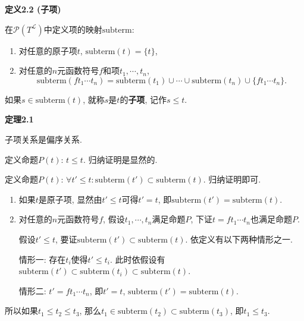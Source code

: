 \documentclass[UTF8]{ctexart}
\begin{document}
\hypertarget{sec:定义2.2}{}
\noindent\textbf{定义2.2 (子项)}

在$\mathcal{P}(T^{\mathcal{L}})$中定义项的映射$\mathrm{subterm}$:
\begin{enumerate}
    \item 对任意的原子项$t$, $\mathrm{subterm}(t)=\{t\}$,
    \item 对任意的$n$元函数符号$f$和项$t_1,\cdots,t_n$,
    \[
        \mathrm{subterm}(ft_1\cdots t_n)=\mathrm{subterm}(t_1)\cup\cdots\cup
        \mathrm{subterm}(t_n)\cup\{ft_1\cdots t_n\}.
    \]
\end{enumerate}

如果$s\in\mathrm{subterm}(t)$, 就称$s$是$t$的\textbf{子项}, 记作$s\leqslant t$.

\vspace{10pt}

\hypertarget{sec:定理2.1}{}
\noindent\textbf{定理2.1}

子项关系是偏序关系.



定义命题$P(t)$: $t\leqslant t$. 归纳证明是显然的.


定义命题$P(t)$: $\forall t'\leqslant t:
\mathrm{subterm}(t')\subset\mathrm{subterm}(t)$. 归纳证明即可.

\begin{enumerate}
    \item 如果$t$是原子项, 显然由$t'\leqslant t$可得$t'=t$,
    即$\mathrm{subterm}(t')=\mathrm{subterm}(t)$.
    \item 对任意的$n$元函数符号$f$, 假设$t_1,\cdots,t_n$满足命题$P$,
    下证$t=ft_1\cdots t_n$也满足命题$P$.

    \hspace{2.17em}
    假设$t'\leqslant t$, 要证$\mathrm{subterm}(t')\subset\mathrm{subterm}(t)$.
    依定义有以下两种情形之一.

    \hspace{2.17em}
    情形一: 存在$t_i$使得$t'\leqslant t_i$. 此时依假设有
    $\mathrm{subterm}(t')\subset\mathrm{subterm}(t_i)\subset\mathrm{subterm}(t)$.

    \hspace{2.17em}
    情形二: $t'=ft_1\cdots t_n$, 即$t'=t$, $\mathrm{subterm}(t')=\mathrm{subterm}(t)$.
\end{enumerate}

所以如果$t_1\leqslant t_2\leqslant t_3$,
那么$t_1\in\mathrm{subterm}(t_2)\subset\mathrm{subterm}(t_3)$, 即$t_1\leqslant t_3$.
\end{document}
